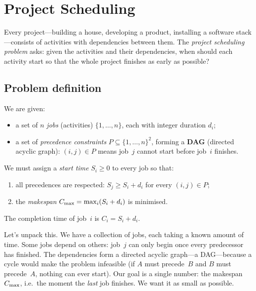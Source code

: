 \section{Project Scheduling}
\label{sec:project-scheduling}

Every project---building a house, developing a product, installing
a software stack---consists of activities with dependencies between
them.
The \emph{project scheduling problem} asks: given the activities
and their dependencies, when should each activity start so that the
whole project finishes as early as possible?

\subsection{Problem definition}
\label{ssec:ps-definition}

\begin{definition}
\label{def:project-scheduling}
We are given:
\begin{itemize}[nosep]
  \item a set of $n$ \emph{jobs} (activities) $\{1,\dots,n\}$,
        each with integer duration $d_i$;
  \item a set of \emph{precedence constraints}
        $P \subseteq \{1,\dots,n\}^2$,
        forming a \textbf{DAG} (directed acyclic graph):
        $(i,j)\in P$ means job~$j$ cannot start before job~$i$
        finishes.
\end{itemize}
We must assign a \emph{start time} $S_i\ge 0$ to every job
so that:
\begin{enumerate}[nosep]
  \item all precedences are respected:
        $S_j \ge S_i + d_i$ for every $(i,j)\in P$;
  \item the \emph{makespan} $C_{\max} = \max_{i} (S_i + d_i)$
        is minimised.
\end{enumerate}
The completion time of job~$i$ is $C_i = S_i + d_i$.
\end{definition}

Let's unpack this.  We have a collection of jobs, each taking a
known amount of time.  Some jobs depend on others: job~$j$ can
only begin once every predecessor has finished.  The dependencies
form a directed acyclic graph---a DAG---because a cycle would make
the problem infeasible (if $A$ must precede~$B$ and $B$ must
precede~$A$, nothing can ever start).
Our goal is a single number: the makespan $C_{\max}$, i.e.\ the
moment the \emph{last} job finishes.  We want it as small as
possible.

